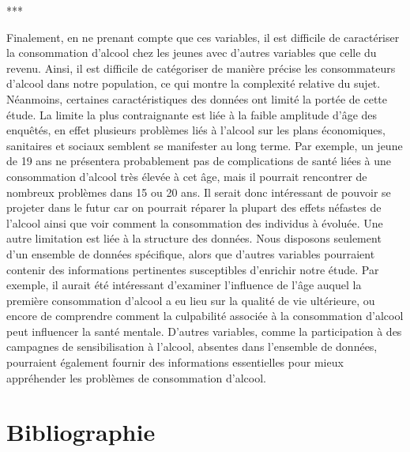\documentclass{article}
\begin{document}
\begin{center}
    ***
\end{center}
Finalement, en ne prenant compte que ces variables, il est difficile de caractériser la consommation d'alcool chez les jeunes avec d’autres variables que celle du revenu.  Ainsi, il est difficile de catégoriser de manière précise les consommateurs d’alcool dans notre population, ce qui montre la complexité relative du sujet.
Néanmoins, certaines caractéristiques des données ont limité la portée de cette étude. La limite la plus contraignante est liée à la faible amplitude d’âge des enquêtés, en effet plusieurs problèmes liés à l'alcool sur les plans économiques, sanitaires et sociaux semblent se manifester au long terme. Par exemple, un jeune de 19 ans ne présentera probablement pas de complications de santé liées à une consommation d'alcool très élevée à cet âge, mais il pourrait rencontrer de nombreux problèmes dans 15 ou 20 ans. Il serait donc intéressant de pouvoir se projeter dans le futur car on pourrait réparer la plupart des effets néfastes de l'alcool ainsi que voir comment la consommation des individus à évoluée.  
Une autre limitation est liée à la structure des données. Nous disposons seulement d'un ensemble de données spécifique, alors que d'autres variables pourraient contenir des informations pertinentes susceptibles d'enrichir notre étude. Par exemple, il aurait été intéressant d'examiner l'influence de l'âge auquel la première consommation d'alcool a eu lieu sur la qualité de vie ultérieure, ou encore de comprendre comment la culpabilité associée à la consommation d'alcool peut influencer la santé mentale. D'autres variables, comme la participation à des campagnes de sensibilisation à l'alcool, absentes dans l'ensemble de données, pourraient également fournir des informations essentielles pour mieux appréhender les problèmes de consommation d'alcool.



\newpage


\section{Bibliographie}
\singlespacing
\renewcommand{\refname}{} %
\end{document}
